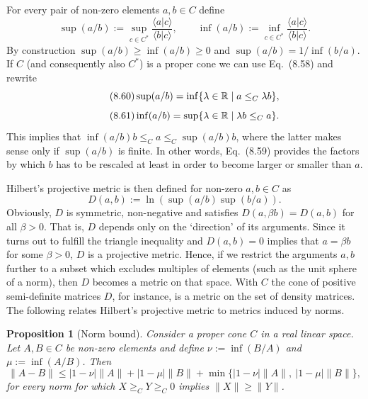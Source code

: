 \documentclass[11pt,a4paper]{article}
\theoremstyle{plain}
\newtheorem{proposition}{Proposition}[section]
\theoremstyle{definition}
\theoremstyle{remark}
\begin{document}
For every pair of non-zero elements $a,b\in C$ define
\begin{equation}\tag{8.59}
    \sup(a/b) := \sup_{c\in C^\ast}\frac{\langle a|c\rangle}{\langle b|c\rangle},
    \qquad
    \inf(a/b) := \inf_{c\in C^\ast}\frac{\langle a|c\rangle}{\langle b|c\rangle}.
\end{equation}
By construction $\sup(a/b)\ge \inf(a/b)\ge 0$ and $\sup(a/b)=1/\inf(b/a)$.
If $C$ (and consequently also $C^\ast$) is a proper cone we can use Eq.~(8.58) and rewrite
\begin{equation}\tag{8.60}
    \sup(a/b)=\inf\{\lambda\in\mathbb{R}\mid a\le_C \lambda b\},
\end{equation}
\begin{equation}\tag{8.61}
    \inf(a/b)=\sup\{\lambda\in\mathbb{R}\mid \lambda b\le_C a\}.
\end{equation}
This implies that $\inf(a/b)b \le_C a \le_C \sup(a/b)b$, where the latter makes sense only if $\sup(a/b)$ is finite.
In other words, Eq.~(8.59) provides the factors by which $b$ has to be rescaled at least in order to become larger or smaller than $a$.

Hilbert's projective metric is then defined for non-zero $a,b\in C$ as
\begin{equation}\tag{8.62}
    D(a,b) := \ln(\sup(a/b)\sup(b/a)).
\end{equation}
Obviously, $D$ is symmetric, non-negative and satisfies $D(a,\beta b)=D(a,b)$ for all $\beta>0$.
That is, $D$ depends only on the `direction' of its arguments. Since it turns out to fulfill the triangle inequality and $D(a,b)=0$
implies that $a=\beta b$ for some $\beta>0$, $D$ is a projective metric. Hence, if we restrict the arguments $a,b$ further to a subset which
excludes multiples of elements (such as the unit sphere of a norm), then $D$ becomes a metric on that space.
With $C$ the cone of positive semi-definite matrices $D$, for instance, is a metric on the set of density matrices.
The following relates Hilbert's projective metric to metrics induced by norms.

\begin{proposition}[Norm bound]
    Consider a proper cone $C$ in a real linear space. Let $A,B\in C$ be non-zero elements and define
    $\nu := \inf(B/A)$ and $\mu := \inf(A/B)$. Then
    \begin{equation}\tag{8.63}
        \|A-B\| \le |1-\nu| \|A\| + |1-\mu| \|B\| + \min\{|1-\nu| \|A\|,\ |1-\mu| \|B\|\},
    \end{equation}
    for every norm for which $X\ge_C Y\ge_C 0$ implies $\|X\|\ge \|Y\|$.
\end{proposition}
\end{document}
